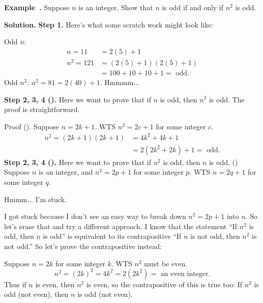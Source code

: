\documentclass[11pt, letterpaper]{report}
\newenvironment{notes}{}{}
\newenvironment{book}{}{}
\newcounter{example}[section]
\newcommand{\example}{\refstepcounter{example}%
\par\noindent\textbf{Example~\theexample.} }
\begin{document}
\begin{notes}
\newpage
\end{notes}

\example Suppose $n$ is an integer. Show that $n$ is odd if and only if $n^2$ is odd.

\begin{notes}
\vfill
\vfill
\end{notes}

\begin{book}
\textbf{Solution.} \textbf{Step 1.} Here's what some scratch work might look like:

\color{blue} Odd $n$: 
\begin{align*}
n=11&=2(5)+1 \\
n^2 = 121 &= (2(5)+1)(2(5)+1) \\
&= 100 + 10 + 10 + 1 = \text{ odd.}
\end{align*}
Odd $n^{2}$: $n^2=81 = 2(40)+1.$ Hmmmm...
\color{black}

\textbf{Step 2, 3, 4 (\rightarrow).} Here we want to prove that if $n$ is odd, then $n^2$ is odd. The proof is straightforward.

\color{blue} Proof (\rightarrow). Suppose $n=2k+1$. WTS $n^2=2c+1$ for some integer $c$.
\begin{align*}
n^2=(2k+1)(2k+1) &= 4k^2+4k+1 \\
&= 2(2k^2+2k) +1 = \text{ odd.}
\end{align*}
\color{black}
\textbf{Step 2, 3, 4 (\leftarrow).} Here we want to prove that if $n^2$ is odd, then $n$ is odd.
\color{blue} (\leftarrow) Suppose $n$ is an integer, and $n^2= 2p+1$ for some integer $p$. WTS $n=2q+1$ for some integer $q$.

Hmmm... I'm stuck. \color{black}

I got stuck because I don't see an easy way to break down $n^2=2p+1$ into $n$. So let's erase that and try a different approach. I know that the statement ``If $n^2$ is odd, then $n$ is odd'' is equivalent to its contrapositive ``If $n$ is not odd, then $n^2$ is not odd.'' So let's prove the contrapositive instead:

\color{blue}
Suppose $n=2k$ for some integer $k$. WTS $n^2$ must be even.
\[n^2=(2k)^2=4k^2 = 2(2k^2) = \text{ an even integer.}\] 
Thus if $n$ is even, then $n^2$ is even, so the contrapositive of this is true too: If $n^2$ is odd (not even), then $n$ is odd (not even). \blacksquare
\color{black}
\end{book}
\end{document}
